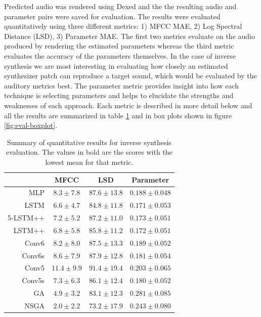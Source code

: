 Predicted audio was rendered using Dexed and the the resulting audio and parameter pairs were saved for evaluation. The results were evaluated quantitatively using three different metrics: 1) MFCC MAE,  2) Log Spectral Distance (LSD), 3) Parameter MAE. The first two metrics evaluate on the audio produced by rendering the estimated parameters whereas the third metric evaluates the accuracy of the parameters themselves. In the case of inverse synthesis we are most interesting in evaluating how closely an estimated synthesizer patch can reproduce a target sound, which would be evaluated by the auditory metrics best. The parameter metric provides insight into how each technique is selecting parameters and helps to elucidate the strengths and weaknesses of each approach. Each metric is described in more detail below and all the results are summarized in table \ref{tbl:objective_resuls} and in box plots shown in figure \ref{fig:eval-boxplot}.

\begin{table}[ht]
\centering
\begin{tabular}{r|ccc}
\toprule
{} & MFCC & LSD & Parameter \\
\midrule
MLP      &       $8.3 \pm 7.8$ &     $87.6 \pm 13.8$ &  $0.188 \pm 0.048$ \\
\midrule
LSTM     &       $6.6 \pm 4.7$ &     $84.8 \pm 11.8$ &  $\mathbf{0.171 \pm 0.053}$ \\
5-LSTM++ &       $7.2 \pm 5.2$ &     $87.2 \pm 11.0$ &  $0.173 \pm 0.051$ \\
LSTM++   &       $6.8 \pm 5.8$ &     $85.8 \pm 11.2$ &  $0.172 \pm 0.051$ \\
\midrule
Conv6    &       $8.2 \pm 8.0$ &     $87.5 \pm 13.3$ &  $0.189 \pm 0.052$ \\
Conv6s   &       $8.6 \pm 7.9$ &     $87.9 \pm 12.8$ &  $0.181 \pm 0.054$ \\
Conv5    &      $11.4 \pm 9.9$ &     $91.4 \pm 19.4$ &  $0.203 \pm 0.065$ \\
Conv5s   &       $7.3 \pm 6.3$ &     $86.1 \pm 12.4$ &  $0.180 \pm 0.052$ \\
\midrule
GA       &       $4.9 \pm 3.2$ &     $83.1 \pm 12.3$ &  $0.281 \pm 0.085$ \\
NSGA     &       $\mathbf{2.0 \pm 2.2}$ &     $\mathbf{73.2 \pm 17.9}$ &  $0.243 \pm 0.080$ \\
\bottomrule
\end{tabular}
\caption{Summary of quantitative results for inverse synthesis evaluation. The values in bold are the scores with the lowest mean for that metric.}
\label{tbl:objective_resuls}
\end{table}

